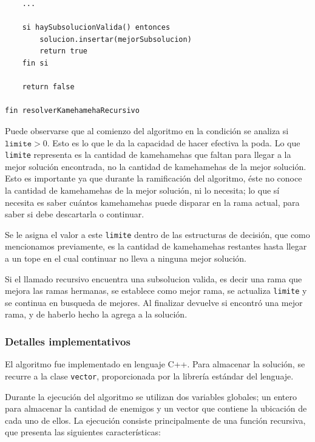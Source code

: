 \begin{enumerate}
\begin{codesnippet}
\begin{verbatim}
    ...
  
    si haySubsolucionValida() entonces
        solucion.insertar(mejorSubsolucion)
        return true
    fin si
  
    return false
  
fin resolverKamehamehaRecursivo
        \end{verbatim}
        \end{codesnippet}

        Puede observarse que al comienzo del algoritmo en la condición se analiza si $\mathtt{limite} > 0$. Esto es lo que le da la capacidad de hacer efectiva la poda. 
        Lo que \texttt{limite} representa es la cantidad de kamehamehas que faltan para llegar a la mejor solución encontrada, no la cantidad de kamehamehas de la mejor solución. Esto es importante ya que durante la ramificación del algoritmo, éste no conoce la cantidad de kamehamehas de la mejor solución, ni lo necesita; lo que sí necesita es saber cuántos kamehamehas puede disparar en la rama actual, para saber si debe descartarla o continuar.

        Se le asigna el valor a este \texttt{limite} dentro de las estructuras de decisión, que como mencionamos previamente, es la cantidad de kamehamehas restantes hasta llegar a un tope en el cual continuar no lleva a ninguna mejor solución.

        Si el llamado recursivo encuentra una subsolucion valida, es decir una rama que mejora las ramas hermanas, se establece como mejor rama, se actualiza \texttt{limite} y se continua en busqueda de mejores. Al finalizar devuelve si encontró una mejor rama, y de haberlo hecho la agrega a la solución.

    \end{enumerate}

    \subsubsection{Detalles implementativos}
    
    El algoritmo fue implementado en lenguaje C++. Para almacenar la solución, se recurre a la clase \texttt{vector}, proporcionada por la librería estándar del lenguaje.

    Durante la ejecución del algoritmo se utilizan dos variables globales; un entero para almacenar la cantidad de enemigos y un vector que contiene la ubicación de cada uno de ellos. La ejecución consiste principalmente de una función recursiva, que presenta las siguientes características:


